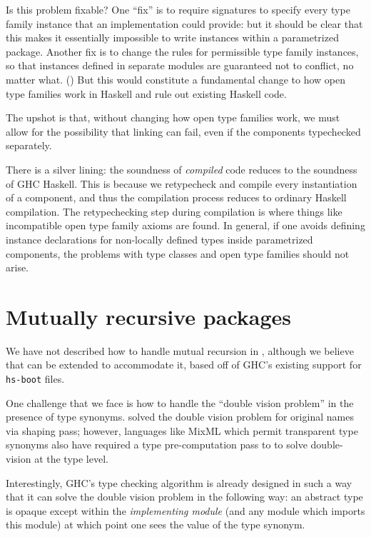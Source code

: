 Is this problem fixable?  One ``fix'' is to require signatures to
specify every type family instance that an implementation could provide:
but it should be clear that this makes it essentially impossible to
write instances within a parametrized package.  Another fix is to change the rules for
permissible type family instances, so that instances defined in separate
modules are guaranteed not to conflict, no matter what. ()  But this would constitute a fundamental change to how open
type families work in Haskell and rule out existing Haskell code.

The upshot is that, without changing how open type families work, we
must allow for the possibility that linking can fail, even if the
components typechecked separately.

There is a silver lining: the soundness of
\emph{compiled} \Backpack{} code reduces to the soundness of GHC
Haskell.  This is because we retypecheck and compile every instantiation
of a component, and thus the compilation process reduces to ordinary
Haskell compilation.  The retypechecking step during compilation is
where things like incompatible open type family axioms are found.
In general, if one avoids defining instance declarations for non-locally
defined types inside parametrized components, the problems with type
classes and open type families should not arise.

\section{Mutually recursive packages}

We have not described how to handle mutual recursion in \Backpack{},
although we believe that \Backpack{} can be extended to accommodate it,
based off of GHC's existing support for \verb|hs-boot| files.

One challenge that we face is how to handle the ``double vision
problem'' in the presence of type synonyms.  \OldBackpack{} solved the
double vision problem for original names via  shaping pass; however,
languages like MixML which permit transparent type synonyms also have
required a type pre-computation pass to to solve double-vision at the
type level.

Interestingly, GHC's type checking algorithm is already designed in
such a way that it can solve the double vision problem in the following
way: an abstract type is opaque except within the \emph{implementing
module} (and any module which imports this module) at which point one
sees the value of the type synonym.

